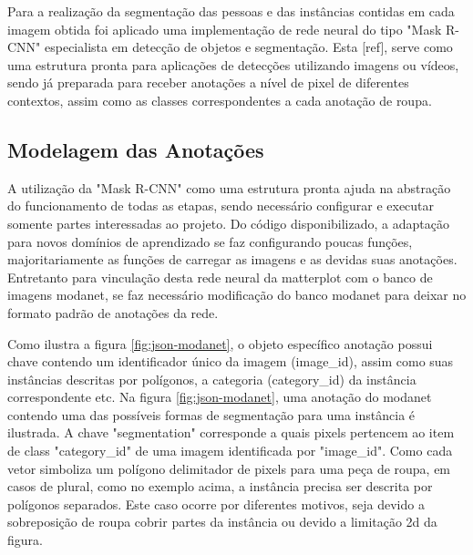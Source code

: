 \documentclass[12pt]{report}
\begin{document}
Para a realização da segmentação das pessoas e das instâncias contidas em cada imagem obtida foi aplicado uma implementação de rede neural do tipo "Mask R-CNN" especialista em detecção de objetos e segmentação. Esta [ref], serve como uma estrutura pronta para aplicações de detecções utilizando imagens ou vídeos, sendo já preparada para receber anotações a nível de pixel de diferentes contextos, assim como as classes correspondentes a cada anotação de roupa.

\subsection{Modelagem das Anotações}

A utilização da "Mask R-CNN" como uma estrutura pronta ajuda na abstração do funcionamento de todas as etapas, sendo necessário configurar e executar somente partes interessadas ao projeto. Do código disponibilizado, a adaptação para novos domínios de aprendizado se faz configurando poucas funções, majoritariamente as funções de carregar as imagens e as devidas suas anotações. Entretanto para vinculação desta rede neural da matterplot com o banco de imagens modanet, se faz necessário modificação do banco modanet para deixar no formato padrão de anotações da rede.

Como ilustra a figura \ref{fig:json-modanet}, o objeto específico anotação possui chave contendo um identificador único da imagem (image\_id), assim como suas instâncias descritas por polígonos, a categoria (category\_id) da instância correspondente etc. Na figura \ref{fig:json-modanet}, uma anotação do modanet contendo uma das possíveis formas de segmentação para uma instância é ilustrada. A chave "segmentation" corresponde a quais pixels pertencem ao item de class "category\_id" de uma imagem identificada por "image\_id". Como cada vetor simboliza um polígono delimitador de pixels para uma peça de roupa, em casos de plural, como no exemplo acima, a instância precisa ser descrita por polígonos separados. Este caso ocorre por diferentes motivos, seja devido a sobreposição de roupa cobrir partes da instância ou devido a limitação 2d da figura.
\end{document}
